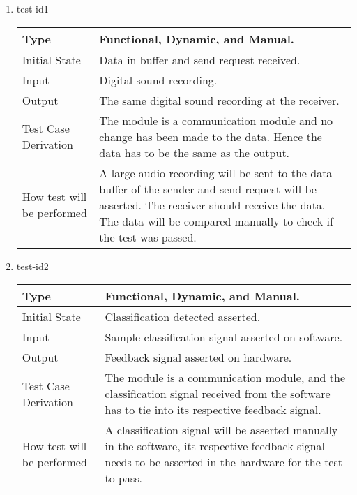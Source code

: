 \documentclass[12pt, titlepage]{article}
\begin{document}
\begin{enumerate}

\item{test-id1\\}

\begin{tabular}{ |p{5cm}||p{7cm}| }
    \hline
    Type & Functional, Dynamic, and Manual. \\
    \hline
    Initial State  &  Data in buffer and send request received. \\
    \hline
    Input &   Digital sound recording.  \\
    \hline
    Output &   The same digital sound recording at the receiver.  \\
    \hline
    Test Case Derivation &   The module is a communication module and no change has been made to the data. Hence the data has to be the same as the output.\\
    \hline
    How test will be performed & A large audio recording will be sent to the data buffer of the sender and send request will be asserted. The receiver should receive the data. The data will be compared manually to check if the test was passed.\\
    \hline
\end{tabular}

\item{test-id2\\}

\begin{tabular}{ |p{5cm}||p{7cm}| }
    \hline
    Type & Functional, Dynamic, and Manual. \\
    \hline
    Initial State  &  Classification detected asserted. \\
    \hline
    Input &   Sample classification signal asserted on software.  \\
    \hline
    Output &   Feedback signal asserted on hardware.  \\
    \hline
    Test Case Derivation &   The module is a communication module, and the classification signal received from the software has to tie into its respective feedback signal.\\
    \hline
    How test will be performed & A classification signal will be asserted manually in the software, its respective feedback signal needs to be asserted in the hardware for the test to pass.\\
    \hline
\end{tabular}

\end{enumerate}
\end{document}
